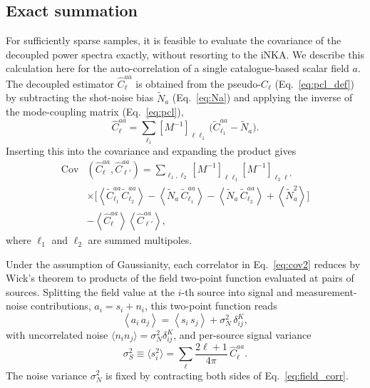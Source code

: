\documentclass[aps,twocolumn, superscriptaddress, english, nofootinbib, 10pt]{revtex4-2}
\begin{document}
  \subsection{Exact summation}\label{ssec:theo.brute}
For sufficiently sparse samples, it is feasible to evaluate the covariance of the decoupled power spectra exactly, without resorting to the iNKA. We describe this calculation here for the auto-correlation of a single catalogue-based scalar field $a$. The decoupled estimator $\hat{C}_\ell^{aa}$ is obtained from the pseudo-$C_\ell$ (Eq.~\ref{eq:pcl_def}) by subtracting the shot-noise bias $\tilde{N}_a$ (Eq.~\ref{eq:Na}) and applying the inverse of the mode-coupling matrix (Eq.~\ref{eq:pcl}),
\begin{equation}\label{eq:invert}
    \hat{C}_{\ell}^{aa} = \sum_{\ell_1} [M^{-1}]_{\ell \ell_1} \, \big(\tilde{C}_{\ell_1}^{aa} - \tilde{N}_a\big).
\end{equation}
Inserting this into the covariance and expanding the product gives
\begin{equation} \label{eq:cov2}
\begin{split}
\mathrm{Cov}&(\hat{C}_\ell^{aa}, \hat{C}_{\ell'}^{aa}) =  \sum_{\ell_1,\ell_2} [M^{-1}]_{\ell\ell_1} [M^{-1}]_{\ell_2\ell'} \\ &\times  \Big[ \left\langle \tilde{C}_{\ell_1}^{aa} \tilde{C}_{\ell_2}^{aa} \right\rangle - \left\langle \tilde{N}_a\,\tilde{C}_{\ell_1}^{aa} \right\rangle 
- \left\langle \tilde{N}_a\,\tilde{C}_{\ell_2}^{aa} \right\rangle + \left\langle \tilde{N}_a^2\right\rangle\Big] \\ & - \left\langle \hat{C}_\ell^{aa} \right\rangle \left\langle \hat{C}_{\ell'}^{aa} \right\rangle,
\end{split}
\end{equation}
where $\ell_1$ and $\ell_2$ are summed multipoles.
 
Under the assumption of Gaussianity, each correlator in Eq.~\ref{eq:cov2} reduces by Wick's theorem to products of the field two-point function evaluated at pairs of sources. Splitting the field value at the $i$-th source into signal and measurement-noise contributions, $a_i = s_i + n_i$, this two-point function reads
\begin{equation} \label{eq:field_corr}
    \left\langle a_i\,a_j\right\rangle = \left\langle s_i\,s_j\right\rangle + \sigma_{N}^2\, \delta^K_{ij},
\end{equation}
with uncorrelated noise $\langle n_i n_j\rangle = \sigma_{N}^2 \delta^K_{ij}$, and per-source signal variance
\begin{equation}
    \sigma_{S}^{2} \equiv \langle s_{i}^2\rangle = \sum_\ell \frac{2\ell + 1}{4\pi}\, \hat{C}_\ell^{aa}.
\end{equation}
The noise variance $\sigma_{N}^2$ is fixed by contracting both sides of Eq.~\ref{eq:field_corr}.
 
\end{document}
